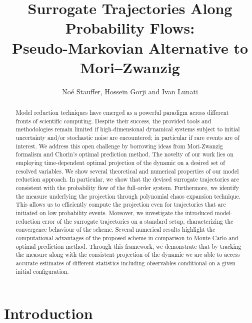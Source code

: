 \documentclass[11pt, a4paper, oneside, reqno]{amsart}
\title[Pseudo-Markovian Alternative to Mori-Zwanzig]{Surrogate Trajectories Along Probability Flows: \\ Pseudo-Markovian Alternative to Mori–Zwanzig}
\author{Noé Stauffer, Hossein Gorji and Ivan Lunati}
\begin{document}
\maketitle

\begin{abstract}
Model reduction techniques have emerged as a powerful paradigm across different fronts of scientific computing. Despite their success, the provided tools and methodologies remain limited if high-dimensional dynamical systems subject to initial uncertainty and/or stochastic noise are encountered; in particular if rare events are of interest. We address this open challenge by borrowing ideas from Mori-Zwanzig formalism and Chorin's optimal prediction method. The novelty of our work lies on employing time-dependent optimal projection of the dynamic on a desired set of resolved variables. We show several theoretical and numerical properties of our model reduction approach. In particular, we show that the devised surrogate trajectories are consistent with the probability flow of the full-order system. Furthermore, we identify the measure underlying the projection through polynomial chaos expansion technique. This allows us to efficiently compute the projection even for trajectories that are initiated on low probability events. Moreover, we investigate the introduced model-reduction error of the surrogate trajectories on a standard setup, characterizing the convergence behaviour of the scheme. Several numerical results highlight the computational advantages of the proposed scheme in comparison to Monte-Carlo and optimal prediction method. Through this framework, we demonstrate that by tracking the measure along with the consistent projection of the dynamic we are able to access accurate estimates of different statistics  including observables conditional on a given initial configuration.
\end{abstract}
\section{Introduction}
\end{document}
